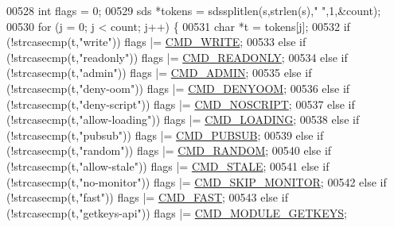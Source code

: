 \begin{DoxyCode}
{00528     \textcolor{keywordtype}{int} flags = 0;
00529     sds *tokens = sdssplitlen(s,strlen(s),\textcolor{stringliteral}{" "},1,&count);
00530     \textcolor{keywordflow}{for} (j = 0; j < count; j++) \{
00531         \textcolor{keywordtype}{char} *t = tokens[j];
00532         \textcolor{keywordflow}{if} (!strcasecmp(t,\textcolor{stringliteral}{"write"})) flags |= \hyperlink{server_8h_a7391deb9c3a262ded3e186e94eb884e2}{CMD\_WRITE};
00533         \textcolor{keywordflow}{else} \textcolor{keywordflow}{if} (!strcasecmp(t,\textcolor{stringliteral}{"readonly"})) flags |= \hyperlink{server_8h_a7e9c728f228e1c82ae1e22173375abcf}{CMD\_READONLY};
00534         \textcolor{keywordflow}{else} \textcolor{keywordflow}{if} (!strcasecmp(t,\textcolor{stringliteral}{"admin"})) flags |= \hyperlink{server_8h_a1917805ea3942a4784ec806c33bc6033}{CMD\_ADMIN};
00535         \textcolor{keywordflow}{else} \textcolor{keywordflow}{if} (!strcasecmp(t,\textcolor{stringliteral}{"deny-oom"})) flags |= \hyperlink{server_8h_aef97c640ad8dfdaca21eb67d4c37e447}{CMD\_DENYOOM};
00536         \textcolor{keywordflow}{else} \textcolor{keywordflow}{if} (!strcasecmp(t,\textcolor{stringliteral}{"deny-script"})) flags |= \hyperlink{server_8h_aaf26ba9b59589bc7701e36fb440a0fbe}{CMD\_NOSCRIPT};
00537         \textcolor{keywordflow}{else} \textcolor{keywordflow}{if} (!strcasecmp(t,\textcolor{stringliteral}{"allow-loading"})) flags |= \hyperlink{server_8h_a5327d118cf467e77d8bb0cebdce3c0ce}{CMD\_LOADING};
00538         \textcolor{keywordflow}{else} \textcolor{keywordflow}{if} (!strcasecmp(t,\textcolor{stringliteral}{"pubsub"})) flags |= \hyperlink{server_8h_a201d97fc457fe5bd58cb863b4ac7a0cc}{CMD\_PUBSUB};
00539         \textcolor{keywordflow}{else} \textcolor{keywordflow}{if} (!strcasecmp(t,\textcolor{stringliteral}{"random"})) flags |= \hyperlink{server_8h_a9f6608fefa355981c2a865ef3d44f196}{CMD\_RANDOM};
00540         \textcolor{keywordflow}{else} \textcolor{keywordflow}{if} (!strcasecmp(t,\textcolor{stringliteral}{"allow-stale"})) flags |= \hyperlink{server_8h_acf1f58ff0b6790cd8d0e3edf1a7e599f}{CMD\_STALE};
00541         \textcolor{keywordflow}{else} \textcolor{keywordflow}{if} (!strcasecmp(t,\textcolor{stringliteral}{"no-monitor"})) flags |= \hyperlink{server_8h_a43e2aecb49a88a6cd4e56bfa971bdc71}{CMD\_SKIP\_MONITOR};
00542         \textcolor{keywordflow}{else} \textcolor{keywordflow}{if} (!strcasecmp(t,\textcolor{stringliteral}{"fast"})) flags |= \hyperlink{server_8h_ae21dc0d9c0dcdefa14ca1054c48f252f}{CMD\_FAST};
00543         \textcolor{keywordflow}{else} \textcolor{keywordflow}{if} (!strcasecmp(t,\textcolor{stringliteral}{"getkeys-api"})) flags |= \hyperlink{server_8h_a612a8681d1a25cd86faf4139d161316a}{CMD\_MODULE\_GETKEYS};
}
\end{DoxyCode}
